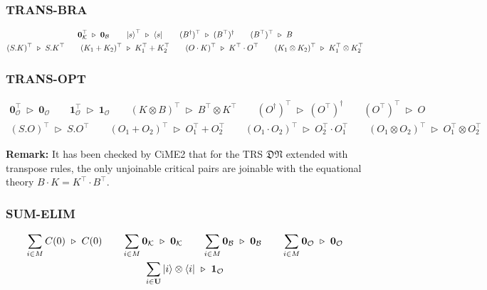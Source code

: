 \documentclass[manuscript, review, timestamp]{acmart}
\newcommand*{\reduce}{\ \triangleright\ }
\begin{document}
\subsubsection*{\textsf{TRANS-BRA}}
\begin{gather*}
  \mathbf{0}_\mathcal{K}^\top \reduce \mathbf{0}_\mathcal{B}
  \qquad
  \ket{s}^\top \reduce \bra{s}
  \qquad
  (B^\dagger)^\top \reduce (B^\top)^\dagger
  \qquad
  (B^\top)^\top \reduce B \\
  (S . K)^\top \reduce S . K^\top
  \qquad
  (K_1 + K_2)^\top \reduce K_1^\top + K_2^\top
  \qquad
  (O \cdot K)^\top \reduce K^\top \cdot O^\top
  \qquad
  (K_1 \otimes K_2)^\top \reduce K_1^\top \otimes K_2^\top
\end{gather*}



\subsubsection*{\textsf{TRANS-OPT}}
\begin{gather*}
  \mathbf{0}_\mathcal{O}^\top \reduce \mathbf{0}_\mathcal{O}
  \qquad
  \mathbf{1}_\mathcal{O}^\top \reduce \mathbf{1}_\mathcal{O}
  \qquad
  (K \otimes B)^\top \reduce B^\top \otimes K^\top
  \qquad
  (O^\dagger)^\top \reduce (O^\top)^\dagger
  \qquad
  (O^\top)^\top \reduce O \\
  (S . O)^\top \reduce S . O^\top
  \qquad
  (O_1 + O_2)^\top \reduce O_1^\top + O_2^\top
  \qquad
  (O_1 \cdot O_2)^\top \reduce O_2^\top \cdot O_1^\top
  \qquad
  (O_1 \otimes O_2)^\top \reduce O_1^\top \otimes O_2^\top
\end{gather*}

\textbf{Remark:} It has been checked by CiME2 that for the TRS $\mathfrak{DN}$ extended with transpose rules, the only unjoinable critical pairs are joinable with the equational theory $B\cdot K = K^\top \cdot B^\top$.


\subsubsection*{\textsf{SUM-ELIM}}

\begin{gather*}
  \sum_{i \in M} C(0) \reduce C(0)
  \qquad
  \sum_{i \in M} \mathbf{0}_\mathcal{K} \reduce \mathbf{0}_\mathcal{K}
  \qquad
  \sum_{i \in M} \mathbf{0}_\mathcal{B} \reduce \mathbf{0}_\mathcal{B}
  \qquad
  \sum_{i \in M} \mathbf{0}_\mathcal{O} \reduce \mathbf{0}_\mathcal{O}\\
  \sum_{i \in \mathbf{U}} \ket{i}\otimes\bra{i} \reduce \mathbf{1}_\mathcal{O}
\end{gather*}
\end{document}
